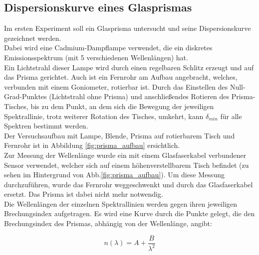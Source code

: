 \documentclass[12pt,a4paper]{article}
\begin{document}
\pagebreak
\setlength{\columnsep}{20pt}
\begin{multicols}{2}


%

\section{Dispersionskurve eines Glasprismas}
Im ersten Experiment soll ein Glasprisma untersucht und seine Dispersionskurve gezeichnet werden.\\
Dabei wird eine Cadmium-Dampflampe verwendet, die ein diskretes Emissionsspektrum (mit 5 verschiedenen Wellenlängen) hat.\\
Ein Lichtstrahl dieser Lampe wird durch einen regelbaren Schlitz erzeugt und auf das Prisma gerichtet. Auch ist ein Fernrohr am Aufbau angebracht, welches, verbunden mit einem Goniometer, rotierbar ist. 
Durch das Einstellen des Null-Grad-Punktes (Lichtstrahl ohne Prisma) und anschließendes Rotieren des Prisma-Tisches, bis zu dem Punkt, an dem sich die Bewegung der jeweiligen Spektrallinie, trotz weiterer Rotation des Tisches, umkehrt, kann $\delta_{min}$ für alle Spektren bestimmt werden. \\
Der Versuchsaufbau mit Lampe, Blende, Prisma auf rotierbarem Tisch und Fernrohr ist in Abbildung \ref{fig:prisma_aufbau} ersichtlich.\\
Zur Messung der Wellenlänge wurde ein mit einem Glasfaserkabel verbundener Sensor verwendet, welcher sich auf einem höhenverstellbarem Tisch befindet (zu sehen im Hintergrund von Abb.\ref{fig:prisma_aufbau}). Um diese Messung durchzuführen, wurde das Fernrohr weggeschwenkt und durch das Glasfaserkabel ersetzt. Das Prisma ist dabei nicht mehr notwendig.
\\ 
Die Wellenlängen der einzelnen Spektrallinien werden gegen ihren jeweiligen Brechungsindex aufgetragen. Es wird eine Kurve durch die Punkte gelegt, die den Brechungsindex des Prismas, abhängig von der Wellenlänge, angibt:

$$n(\lambda) = A + \frac{B}{\lambda^2}$$
\\



\end{multicols}
\end{document}
